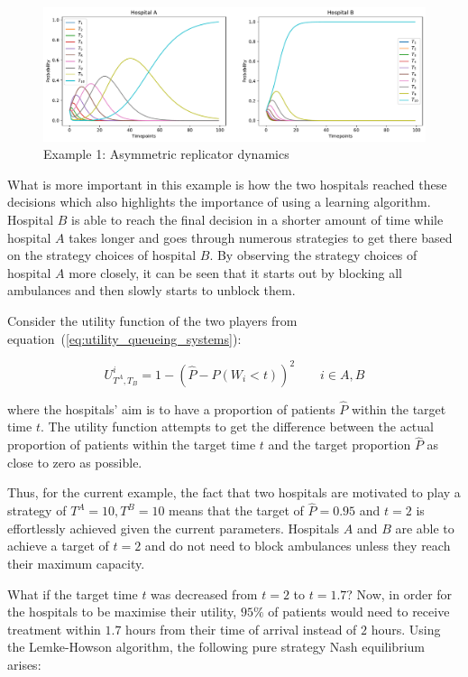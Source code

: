 \begin{figure}[H]
    \centering
    \includegraphics[width=\linewidth]{chapters/05_numerical_results/Bin/example_1/base_case.pdf}
    \caption{Example 1: Asymmetric replicator dynamics}
    \label{fig:asymmetric_replicator_dynamics_example_1}
\end{figure}

What is more important in this example is how the two hospitals reached these
decisions which also highlights the importance of using a learning algorithm.
Hospital \(B\) is able to reach the final decision in a shorter amount of time
while  hospital \(A\) takes longer and goes through numerous strategies to get
there based on the strategy choices of hospital \(B\).
By observing the strategy choices of hospital \(A\) more closely, it can be seen
that it starts out by blocking all ambulances and then slowly starts to unblock
them.

Consider the utility function of the two players from
equation~(\ref{eq:utility_queueing_systems}):

\begin{equation*}
    U_{T^A, T_B}^i = 1 - \left( \hat{P} - P(W_i < t) \right)^2
    \qquad i \in {A, B}
\end{equation*}

where the hospitals' aim is to have a proportion of patients \(\hat{P}\)
within the target time \(t\).
The utility function attempts to get the difference between the actual
proportion of patients within the target time \(t\) and the target proportion
\(\hat{P}\) as close to zero as possible.

Thus, for the current example, the fact that two hospitals are
motivated to play a strategy of \(T^A = 10, T^B = 10\) means that the target
of \(\hat{P} = 0.95\) and \(t = 2\) is effortlessly achieved given the current
parameters.
Hospitals \(A\) and \(B\) are able to achieve a target of \(t = 2\) and do not
need to block ambulances unless they reach their maximum capacity.

What if the target time \(t\) was decreased from \(t = 2\) to \(t = 1.7\)?
Now, in order for the hospitals to be maximise their utility, \(95\%\) of
patients would need to receive treatment within \(1.7\) hours from their time
of arrival instead of \(2\) hours.
Using the Lemke-Howson algorithm, the following pure strategy Nash equilibrium
arises:

